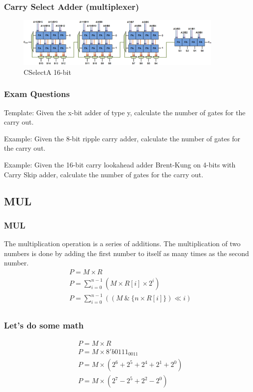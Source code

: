 \begin{frame}
    \frametitle{Carry Select Adder (multiplexer)}
    \begin{figure}
        \centering
        \includegraphics[width=0.9\textwidth]{media/Carry-select-adder-fixed-size.png}
        \caption{CSelectA 16-bit}
    \end{figure}
\end{frame}

\begin{frame}
    \frametitle{Exam Questions}
    Template: Given the x-bit adder of type y, calculate the number of gates for the carry out.

    Example: Given the 8-bit ripple carry adder, calculate the number of gates for the carry out.

    Example: Given the 16-bit carry lookahead adder Brent-Kung on 4-bits with Carry Skip adder, calculate the number of gates for the carry out.
\end{frame}

\subsection{MUL}

\begin{frame}
    \frametitle{MUL}
    The multiplication operation is a series of additions. The multiplication of two numbers is done by adding the first number to itself as many times as the second number.
    \begin{equation}
        \begin{aligned}
            &P = M \times R\\
            &P=\sum_{i=0}^{n-1} (M \times R[i] \times 2^i)\\
            &P=\sum_{i=0}^{n-1} ((M \ \& \ \{n \times R[i]\}) \ll i)\\
        \end{aligned}
    \end{equation}
\end{frame}

\begin{frame}
    \frametitle{Let's do some math}
    \begin{equation}
        \begin{aligned}
            &P = M \times R\\
            &P = M \times 8'b0111_0011\\
            &P = M \times (2^6 + 2^5 + 2^4 + 2^1 + 2^0)\\
            &P = M \times (2^7 - 2^5 + 2^2 - 2^0)\\
        \end{aligned}
    \end{equation}
\end{frame}

